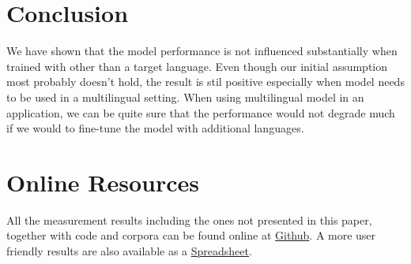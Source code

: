 \documentclass[sigconf]{acmart}
\begin{document}
\section{Conclusion}
We have shown that the model performance is not influenced substantially when trained with other than a target language.
Even though our initial assumption most probably doesn't hold, the result is stil positive especially when model needs to be used in a multilingual setting.
When using multilingual model in an application, we can be quite sure that the performance would not degrade much if we would to fine-tune the model with additional languages.





\appendix

\section{Online Resources}

All the measurement results including the ones not presented in this paper, together with code and corpora can be found online at
{\color{blue}\href{https://github.com/ivlcic/trans-ner}{Github}}.
A more user friendly results are also available as a
{\color{blue}\href{https://docs.google.com/spreadsheets/d/16UaPR-qneNN8mlzjNkjc9kdry2eQl4J84t3EfDOtBj0/edit?usp=sharing}{Spreadsheet}}.
\end{document}
